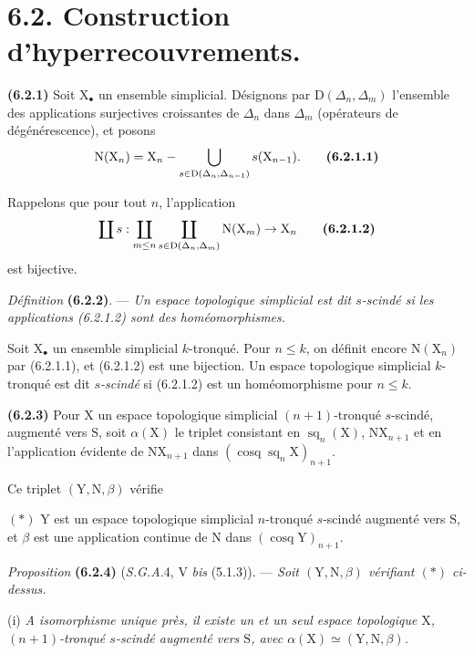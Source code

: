 \documentclass[11pt,leqno]{article}
\newcommand{\Page}[1]{\ifvmode\noindent\else\unskip\ \fi{\footnotesize\textcolor{gray}{[p.\,#1]}}\ \ignorespaces}
\begin{document}
\Page{19}
\section*{6.2. Construction d’hyperrecouvrements.}

\textbf{(6.2.1)} Soit \(\mathrm{X}_{\bullet}\) un ensemble simplicial. Désignons par \(\mathrm{D}(\Delta_n,\Delta_m)\) l’ensemble des applications surjectives croissantes de \(\Delta_n\) dans \(\Delta_m\) (opérateurs de dégénérescence), et posons
\[
\mathrm{N}(\mathrm{X}_n)
=\mathrm{X}_n-\bigcup_{s\in\mathrm{D}(\Delta_n,\Delta_{n-1})}
s(\mathrm{X}_{n-1}).
\tag*{\textbf{(6.2.1.1)}}
\]

Rappelons que pour tout \(n\), l’application
\[
\coprod s:
\coprod_{m\leq n}\coprod_{s\in\mathrm{D}(\Delta_n,\Delta_m)}
\mathrm{N}(\mathrm{X}_m)\to\mathrm{X}_n
\tag*{\textbf{(6.2.1.2)}}
\]
est bijective.

\textit{Définition} \textbf{(6.2.2)}. — \textit{Un espace topologique simplicial est dit \textup{\(s\)-scindé} si les applications \textup{(6.2.1.2)} sont des homéomorphismes.}

Soit \(\mathrm{X}_{\bullet}\) un ensemble simplicial \(k\)-tronqué. Pour \(n\leq k\), on définit encore \(\mathrm{N}(\mathrm{X}_n)\) par (6.2.1.1), et (6.2.1.2) est une bijection. Un espace topologique simplicial \(k\)-tronqué est dit \textit{\(s\)-scindé} si (6.2.1.2) est un homéomorphisme pour \(n\leq k\).

\textbf{(6.2.3)} Pour \(\mathrm{X}\) un espace topologique simplicial \((n+1)\)-tronqué \(s\)-scindé, augmenté vers \(\mathrm{S}\), soit \(\alpha(\mathrm{X})\) le triplet consistant en \(\operatorname{sq}_n(\mathrm{X})\), \(\mathrm{N}\mathrm{X}_{n+1}\) et en l’application évidente de \(\mathrm{N}\mathrm{X}_{n+1}\) dans \((\operatorname{cosq}\operatorname{sq}_n\mathrm{X})_{n+1}\).

Ce triplet \((\mathrm{Y},\mathrm{N},\beta)\) vérifie

\((\ast)\) \(\mathrm{Y}\) est un espace topologique simplicial \(n\)-tronqué \(s\)-scindé augmenté vers \(\mathrm{S}\), et \(\beta\) est une application continue de \(\mathrm{N}\) dans \((\operatorname{cosq}\mathrm{Y})_{n+1}\).

\textit{Proposition} \textbf{(6.2.4)} (\textit{S.G.A.}4, V \textit{bis} (5.1.3)). — \textit{Soit \((\mathrm{Y},\mathrm{N},\beta)\) vérifiant \((\ast)\) ci-dessus.}

(i) \textit{A isomorphisme unique près, il existe un et un seul espace topologique \(\mathrm{X}\), \((n+1)\)-tronqué \(s\)-scindé augmenté vers \(\mathrm{S}\), avec \(\alpha(\mathrm{X})\simeq(\mathrm{Y},\mathrm{N},\beta)\).}
\end{document}
